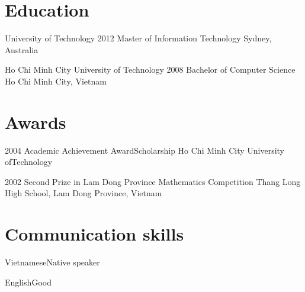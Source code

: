 \documentclass{tccv}
\begin{document}
\section{Education}
\begin{yearlist}

\item[University of Technology]{2012}
    {Master of Information Technology}
    {Sydney, Australia}

\item[Ho Chi Minh City University of Technology]{2008}
    {Bachelor of Computer Science}
    {Ho Chi Minh City, Vietnam}

\end{yearlist}

\section{Awards}

\begin{yearlist}

\item{2004}
    {Academic Achievement Award\newline Scholarship}
    {Ho Chi Minh City University of\newline Technology}

\item{2002}
    {Second Prize in Lam Dong Province Mathematics Competition}
    {Thang Long High School, Lam Dong Province, Vietnam}

\end{yearlist}

\section{Communication skills}

\begin{factlist}
\item{Vietnamese}{Native speaker}
\item{English}{Good}
\end{factlist}
\end{document}
